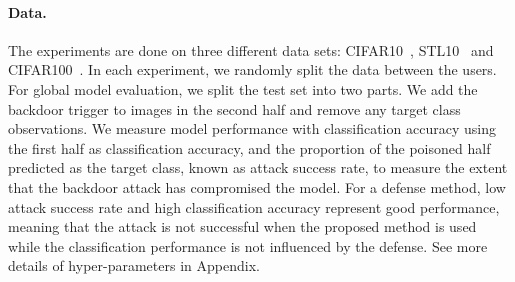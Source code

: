 \documentclass{article} %
\begin{document}
\paragraph{Data.} The experiments are done on three different data sets: CIFAR10~\citep{krizhevsky2009learning}, STL10~\citep{coates2011analysis} and CIFAR100~\citep{krizhevsky2009learning}. In each experiment, we randomly split the data between the users. For global model evaluation, we split the test set into two parts. We add the backdoor trigger to images in the second half and remove any target class observations. We measure model performance with classification accuracy using the first half as {\color{blue}classification accuracy}, and the proportion of the poisoned half predicted as the target class, known as {\color{red}attack success rate}, to measure the extent that the backdoor attack has compromised the model. For a defense method, low attack success rate and high classification accuracy represent good performance, meaning that the attack is not successful when the proposed method is used while the classification performance is not influenced by the defense. See more details of hyper-parameters in Appendix.
\end{document}

